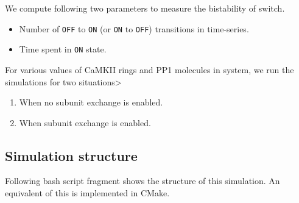 \documentclass[]{article}
\newenvironment{Shaded}{}{}
\newcommand{\KeywordTok}[1]{\textcolor[rgb]{0.00,0.44,0.13}{\textbf{#1}}}
\newcommand{\StringTok}[1]{\textcolor[rgb]{0.25,0.44,0.63}{#1}}
\newcommand{\FunctionTok}[1]{\textcolor[rgb]{0.02,0.16,0.49}{#1}}
\newcommand{\VariableTok}[1]{\textcolor[rgb]{0.10,0.09,0.49}{#1}}
\newcommand{\ExtensionTok}[1]{#1}
\newcommand{\NormalTok}[1]{#1}
\providecommand{\tightlist}{%
  \setlength{\itemsep}{0pt}\setlength{\parskip}{0pt}}
\begin{document}
We compute following two parameters to measure the bistability of
switch.

\begin{itemize}
\tightlist
\item
  Number of \texttt{OFF} to \texttt{ON} (or \texttt{ON} to \texttt{OFF})
  transitions in time-series.
\item
  Time spent in \texttt{ON} state.
\end{itemize}

For various values of CaMKII rings and PP1 molecules in system, we run
the simulations for two situations\textgreater{}

\begin{enumerate}
\def\labelenumi{\arabic{enumi}.}
\tightlist
\item
  When no subunit exchange is enabled.
\item
  When subunit exchange is enabled.
\end{enumerate}

\subsection{Simulation structure}\label{simulation-structure}

Following bash script fragment shows the structure of this simulation.
An equivalent of this is implemented in CMake.

\begin{Shaded}
\end{Shaded}
\end{document}

